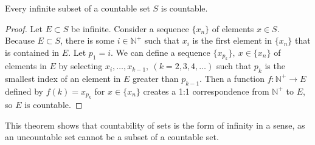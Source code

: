 \documentclass[12pt]{article}
\begin{document}
\begin{thm}
  Every infinite subset of a countable set $S$ is countable.

  \begin{proof}
    Let $E \subset S$ be infinite. Consider a sequence $\{x_n\}$ of elements $x \in
    S$. Because $E \subset S$, there is some $i \in \mathbb{N}^+$ such that $x_i$ is
    the first element in $\{x_n\}$ that is contained in $E$. Let $p_1 = i$. We can define a sequence
    $\{x_{p_k}\},\ x \in \{x_n\}$ of elements in $E$ by selecting $x_i,\ldots,x_{k-1},\
    (k = 2,3,4,\ldots)$ such that $p_k$ is the smallest index of an element in $E$
    greater than $p_{k-1}$. Then a function $f: \mathbb{N}^+ \to E$ defined by $f(k)
    = x_{p_k}$ for $x \in \{x_n\}$ creates a 1:1 correspondence from $\mathbb{N}^+$
    to $E$, so $E$ is countable.
  \end{proof}
\end{thm}

\begin{comm}
  This theorem shows that countability of sets is the  form of infinity
  in a sense, as an uncountable set cannot be a subset of a countable set.
\end{comm}
\end{document}
